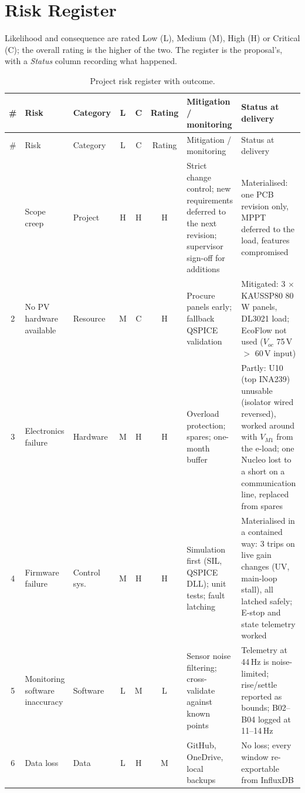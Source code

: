 \section{Risk Register}
\label{app:risk}
Likelihood and consequence are rated Low (L), Medium (M), High (H) or Critical (C); the overall rating is the higher of the two. The register is the proposal's, with a \emph{Status} column recording what happened.

\begin{landscape}
\footnotesize
\begin{longtable}{c p{3.1cm} l c c c p{7.3cm} p{7.3cm}}
\caption{Project risk register with outcome.}\label{tab:risk}\\
\toprule
\# & Risk & Category & L & C & Rating & Mitigation / monitoring & Status at delivery\\
\midrule\endfirsthead
\toprule
\# & Risk & Category & L & C & Rating & Mitigation / monitoring & Status at delivery\\
\midrule\endhead
\bottomrule\endfoot
1 & Scope creep & Project & H & H & H & Strict change control; new requirements deferred to the next revision; supervisor sign-off for additions & Materialised: one PCB revision only, MPPT deferred to the load, features compromised\\
2 & No PV hardware available & Resource & M & C & H & Procure panels early; fallback QSPICE validation & Mitigated: 3 $\times$ KAUSSP80 80\,W panels, DL3021 load; EcoFlow not used ($V_{oc}$ 75\,V $>$ 60\,V input)\\
3 & Electronics failure & Hardware & M & H & H & Overload protection; spares; one-month buffer & Partly: U10 (top INA239) unusable (isolator wired reversed), worked around with $V_{M1}$ from the e-load; one Nucleo lost to a short on a communication line, replaced from spares\\
4 & Firmware failure & Control sys. & M & H & H & Simulation first (SIL, QSPICE DLL); unit tests; fault latching & Materialised in a contained way: 3 trips on live gain changes (UV, main-loop stall), all latched safely; E-stop and state telemetry worked\\
5 & Monitoring software inaccuracy & Software & L & M & L & Sensor noise filtering; cross-validate against known points & Telemetry at 44\,Hz is noise-limited; rise/settle reported as bounds; B02--B04 logged at 11--14\,Hz\\
6 & Data loss & Data & L & H & M & GitHub, OneDrive, local backups & No loss; every window re-exportable from InfluxDB\\

\end{longtable}
\end{landscape}
